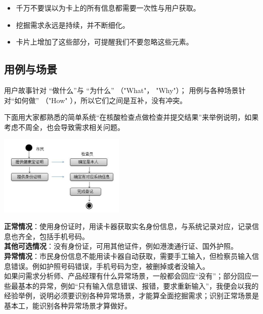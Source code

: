 \begin{itemize}
\tightlist
\item
  千万不要误以为卡上的所有信息都需要一次性与用户获取。
\item
  挖掘需求永远是持续，并不断细化。
\item
  卡片上增加了这些部分，可提醒我们不要忽略这些元素。
\end{itemize}

\hypertarget{ux7528ux4f8bux4e0eux573aux666f}{%
\subsection{用例与场景}\label{ux7528ux4f8bux4e0eux573aux666f}}

用户故事针对 ``做什么''与 ``为什么'' （"What"， "Why"）；
用例与各种场景针对``如何做'' （"How" ），所以它们之间是互补，没有冲突。

下面用大家都熟悉的简单系统``在核酸检查点做检查并提交结果''来举例说明，如果考虑不周全，也会导致需求相关问题。


\includegraphics[width=6cm]{CI场景图}

\textbf{正常情况}：使用身份证时，用读卡器获取实名身份信息，与系统记录对应，记录信息也齐全，包括手机号码。\\
\textbf{其他可选情况}：没有身份证，可用其他证件，例如港澳通行证、国外护照。\\
\textbf{异常情况}：市民身份信息不能用读卡器自动获取，需要手工输入，但检察员输入信息错误。例如护照号码错误，手机号码为空，被删掉或者没输入。\\
如果问需求分析师、产品经理有什么异常场景，一般都会回应``没有''；部分回应一些最基本的异常，例如``只有输入信息错误、报错，要求重新输入''，我便会以我的经验举例，说明必须要识别各种异常场景，才能算全面挖掘需求；识别正常场景是基本工，能识别各种异常场景才算做好。

